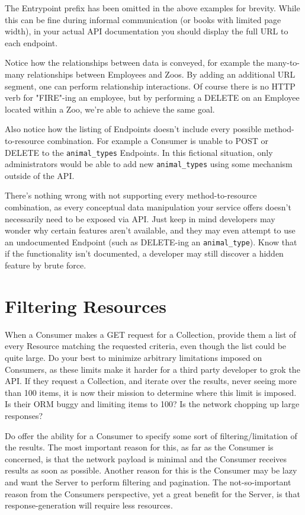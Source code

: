 The Entrypoint prefix has been omitted in the above examples for brevity. While this can be fine during informal communication (or books with limited page width), in your actual API documentation you should display the full URL to each endpoint.

Notice how the relationships between data is conveyed, for example the many-to-many relationships between Employees and Zoos. By adding an additional URL segment, one can perform relationship interactions. Of course there is no HTTP verb for "FIRE"-ing an employee, but by performing a DELETE on an Employee located within a Zoo, we're able to achieve the same goal.

Also notice how the listing of Endpoints doesn't include every possible method-to-resource combination. For example a Consumer is unable to POST or DELETE to the \texttt{animal\_types} Endpoints. In this fictional situation, only administrators would be able to add new \texttt{animal\_types} using some mechanism outside of the API.

There's nothing wrong with not supporting every method-to-resource combination, as every conceptual data manipulation your service offers doesn't necessarily need to be exposed via API. Just keep in mind developers may wonder why certain features aren't available, and they may even attempt to use an undocumented Endpoint (such as DELETE-ing an \texttt{animal\_type}). Know that if the functionality isn't documented, a developer may still discover a hidden feature by brute force.


\section{Filtering Resources}

When a Consumer makes a GET request for a Collection, provide them a list of every Resource matching the requested criteria, even though the list could be quite large. Do your best to minimize arbitrary limitations imposed on Consumers, as these limits make it harder for a third party developer to grok the API. If they request a Collection, and iterate over the results, never seeing more than 100 items, it is now their mission to determine where this limit is imposed. Is their ORM buggy and limiting items to 100? Is the network chopping up large responses?

Do offer the ability for a Consumer to specify some sort of filtering/limitation of the results. The most important reason for this, as far as the Consumer is concerned, is that the network payload is minimal and the Consumer receives results as soon as possible. Another reason for this is the Consumer may be lazy and want the Server to perform filtering and pagination. The not-so-important reason from the Consumers perspective, yet a great benefit for the Server, is that response-generation will require less resources.

